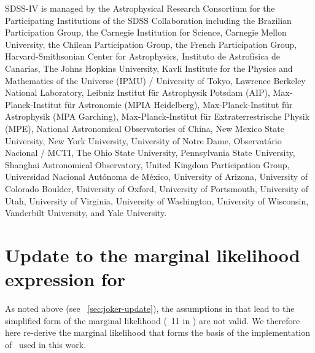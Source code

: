 \documentclass[modern]{aastex63}
\begin{document}
SDSS-IV is managed by the Astrophysical Research Consortium for the
Participating Institutions of the SDSS Collaboration including the Brazilian
Participation Group, the Carnegie Institution for Science, Carnegie Mellon
University, the Chilean Participation Group, the French Participation Group,
Harvard-Smithsonian Center for Astrophysics, Instituto de Astrof\'isica de
Canarias, The Johns Hopkins University, Kavli Institute for the Physics and
Mathematics of the Universe (IPMU) / University of Tokyo, Lawrence Berkeley
National Laboratory, Leibniz Institut f\"ur Astrophysik Potsdam (AIP),
Max-Planck-Institut f\"ur Astronomie (MPIA Heidelberg), Max-Planck-Institut
f\"ur Astrophysik (MPA Garching), Max-Planck-Institut f\"ur Extraterrestrische
Physik (MPE), National Astronomical Observatories of China, New Mexico State
University, New York University, University of Notre Dame, Observat\'ario
Nacional / MCTI, The Ohio State University, Pennsylvania State University,
Shanghai Astronomical Observatory, United Kingdom Participation Group,
Universidad Nacional Aut\'onoma de M\'exico, University of Arizona, University
of Colorado Boulder, University of Oxford, University of Portsmouth, University
of Utah, University of Virginia, University of Washington, University of
Wisconsin, Vanderbilt University, and Yale University.




\appendix

\section{Update to the marginal likelihood expression for \thejoker}
\label{app:marginal-likelihood}

As noted above (see \sectionname~\ref{sec:joker-update}), the assumptions in
\cite{thejoker} that lead to the simplified form of the marginal likelihood
(\equationname~11 in \citealt{thejoker}) are not valid.
We therefore here re-derive the marginal likelihood that forms the basis of the
implementation of \thejoker\ used in this work.
\end{document}
